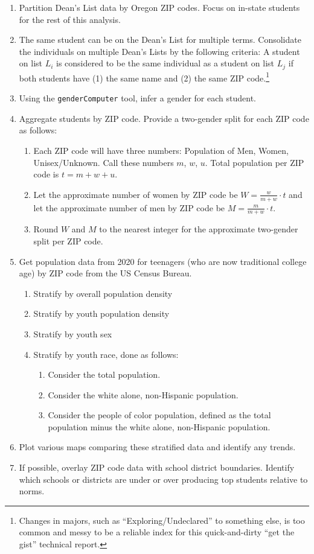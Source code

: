 \documentclass[10]{article}
\begin{document}
\begin{enumerate}
	\item Partition Dean's List data by Oregon ZIP codes. Focus on in-state students for the rest of this analysis.
	\item The same student can be on the Dean's List for multiple terms. Consolidate the individuals on multiple Dean's Lists by the following criteria:
	A student on list $L_i$ is considered to be the same individual as a student on list $L_j$ if both students have (1) the same name and (2) the same ZIP code.\footnote{Changes in majors, such as ``Exploring/Undeclared'' to something else, is too common and messy to be a reliable index for this quick-and-dirty ``get the gist'' technical report.}
	\item Using the \texttt{genderComputer} tool, infer a gender for each student.
	\item Aggregate students by ZIP code. Provide a two-gender split for each ZIP code as follows:
	\begin{enumerate}
		\item Each ZIP code will have three numbers: Population of Men, Women, Unisex/Unknown. Call these numbers $m$, $w$, $u$. Total population per ZIP code is $t=m+w+u$.
		\item Let the approximate number of women by ZIP code be $W=\frac{w}{m+w} \cdot t$ and let the approximate number of men by ZIP code be $M=\frac{m}{m+w} \cdot t$.
		\item Round $W$ and $M$ to the nearest integer for the approximate two-gender split per ZIP code.
	\end{enumerate}
	\item Get population data from 2020 for teenagers (who are now traditional college age) by ZIP code from the US Census Bureau.
	\begin{enumerate}
		\item Stratify by overall population density
		\item Stratify by youth population density
		\item Stratify by youth sex
		\item Stratify by youth race, done as follows:
		\begin{enumerate}
			\item Consider the total population.
			\item Consider the white alone, non-Hispanic population.
			\item Consider the people of color population, defined as the total population minus the white alone, non-Hispanic population.
		\end{enumerate}
	\end{enumerate}
	\item Plot various maps comparing these stratified data and identify any trends. 
	\item If possible, overlay ZIP code data with school district boundaries. Identify which schools or districts are under or over producing top students relative to norms.
\end{enumerate}
\end{document}
